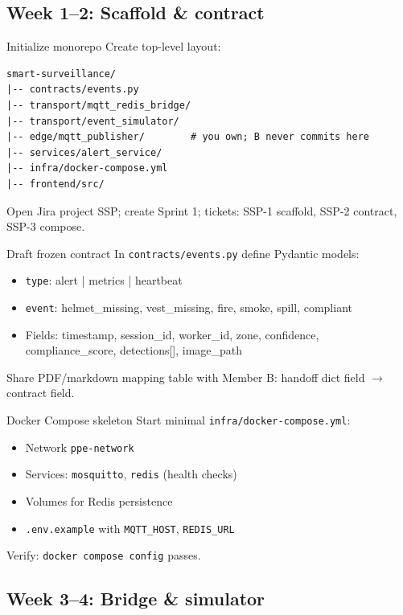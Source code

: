 \documentclass[12pt,a4paper]{report}
\begin{document}
\subsection{Week 1--2: Scaffold \& contract}

\begin{stepbox}{Initialize monorepo}
Create top-level layout:
\begin{verbatim}
smart-surveillance/
|-- contracts/events.py
|-- transport/mqtt_redis_bridge/
|-- transport/event_simulator/
|-- edge/mqtt_publisher/        # you own; B never commits here
|-- services/alert_service/
|-- infra/docker-compose.yml
|-- frontend/src/
\end{verbatim}
Open Jira project SSP; create Sprint 1; tickets: SSP-1 scaffold, SSP-2 contract, SSP-3 compose.
\end{stepbox}

\begin{stepbox}{Draft frozen contract}
In \texttt{contracts/events.py} define Pydantic models:
\begin{itemize}
    \item \texttt{type}: alert | metrics | heartbeat
    \item \texttt{event}: helmet\_missing, vest\_missing, fire, smoke, spill, compliant
    \item Fields: timestamp, session\_id, worker\_id, zone, confidence, compliance\_score, detections[], image\_path
\end{itemize}
Share PDF/markdown mapping table with Member B: handoff dict field $\rightarrow$ contract field.
\end{stepbox}

\begin{stepbox}{Docker Compose skeleton}
Start minimal \texttt{infra/docker-compose.yml}:
\begin{itemize}
    \item Network \texttt{ppe-network}
    \item Services: \texttt{mosquitto}, \texttt{redis} (health checks)
    \item Volumes for Redis persistence
    \item \texttt{.env.example} with \texttt{MQTT\_HOST}, \texttt{REDIS\_URL}
\end{itemize}
Verify: \texttt{docker compose config} passes.
\end{stepbox}

\subsection{Week 3--4: Bridge \& simulator}
\end{document}
